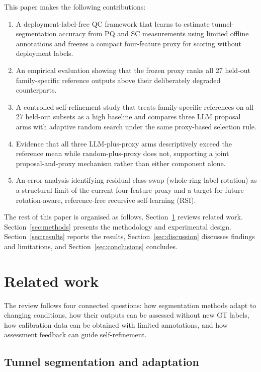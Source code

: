 \documentclass[a4paper,fleqn]{cas-dc}
\begin{document}
{This paper makes the following contributions:
\begin{enumerate}
\item A deployment-label-free QC framework that learns to estimate tunnel-segmentation accuracy from PQ and SC measurements using limited offline annotations and freezes a compact four-feature proxy for scoring without deployment labels.
\item An empirical evaluation showing that the frozen proxy ranks all 27 held-out family-specific reference outputs above their deliberately degraded counterparts.
\item A controlled self-refinement study that treats family-specific references on all 27 held-out subsets as a high baseline and compares three LLM proposal arms with adaptive random search under the same proxy-based selection rule.
\item Evidence that all three LLM-plus-proxy arms descriptively exceed the reference mean while random-plus-proxy does not, supporting a joint proposal-and-proxy mechanism rather than either component alone.
\item An error analysis identifying residual class-swap (whole-ring label rotation) as a structural limit of the current four-feature proxy and a target for future rotation-aware, reference-free recursive self-learning (RSI).
\end{enumerate}

The rest of this paper is organised as follows. Section~\ref{sec:related} reviews related work. Section~\ref{sec:methods} presents the methodology and experimental design. Section~\ref{sec:results} reports the results, Section~\ref{sec:discussion} discusses findings and limitations, and Section~\ref{sec:conclusions} concludes.


\section{Related work}
\label{sec:related}

The review follows four connected questions: how segmentation methods adapt to changing conditions, how their outputs can be assessed without new GT labels, how calibration data can be obtained with limited annotations, and how assessment feedback can guide self-refinement.

\subsection{Tunnel segmentation and adaptation}

}
\end{document}
